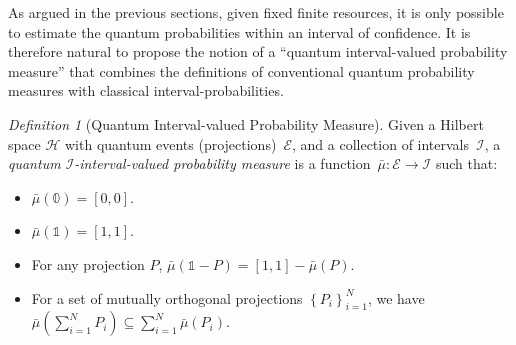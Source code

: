 \documentclass{article}
\theoremstyle{remark}
\newtheorem{definition}{Definition}
\newcommand{\Hilb}{\mathcal{H}}
\newcommand{\events}{\ensuremath{\mathcal{E}}}
\begin{document}
As argued in the previous sections, given fixed finite resources,
it is only possible to estimate the quantum probabilities within an
interval of confidence. It is therefore natural to propose the notion
of a ``quantum interval-valued probability measure'' that combines
the definitions of conventional quantum probability measures with
classical interval-probabilities.

\begin{definition}[Quantum Interval-valued Probability Measure]\label{def:QuantumInterval-valuedProbability}
  Given a Hilbert space $\Hilb$ with quantum events
  (projections)~$\events$, and a collection of
  intervals~$\mathscr{I}$, a \emph{quantum
    $\mathscr{I}$-interval-valued probability measure} is a
  function~$\bar{\mu}:\events\rightarrow\mathscr{I}$ such that:
\begin{itemize}
\item $\bar{\mu}(\mathbb{0})=\left[0,0\right]$. 
\item $\bar{\mu}(\mathbb{1})=\left[1,1\right]$. 
\item For any projection $P$,
  $\bar{\mu}\left(\mathbb{1}-P\right)=\left[1,1\right]-\bar{\mu}\left(P\right)$.
\item For a set of mutually orthogonal projections
  $\left\{ P_{i}\right\} _{i=1}^{N}$, we have
  $\bar{\mu}\left(\sum_{i=1}^{N}
    P_{i}\right)\subseteq\sum_{i=1}^{N}\bar{\mu}\left(P_{i}\right)$.
\end{itemize}
\end{definition}
\end{document}
